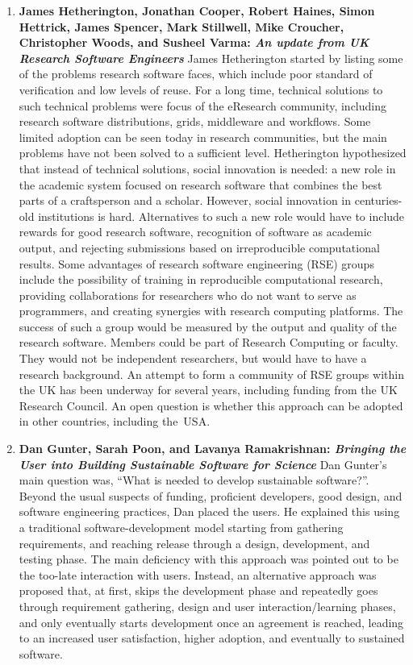 \documentclass[11pt, oneside]{amsart}
\begin{document}
\begin{enumerate}
\item \textbf{James Hetherington, Jonathan Cooper, Robert Haines, Simon
Hettrick, James Spencer, Mark Stillwell, Mike Croucher, Christopher Woods, and
Susheel Varma: \textit{An update from UK Research Software Engineers}} James
Hetherington started by listing some of the problems research software faces,
which include poor standard of verification and low levels of reuse. For a long
time, technical solutions to such technical problems were focus of the eResearch
community, including research software distributions, grids, middleware and
workflows. Some limited adoption can be seen today in research communities, but
the main problems have not been solved to a sufficient level. Hetherington
hypothesized that instead of technical solutions, social innovation is needed: a
new role in the academic system focused on research software that combines the
best parts of a craftsperson and a scholar. However, social innovation in
centuries-old institutions is hard. Alternatives to such a new role would have
to include rewards for good research software, recognition of software as
academic output, and rejecting submissions based on irreproducible computational
results. Some advantages of research software engineering (RSE) groups include
the possibility of training in reproducible computational research, providing
collaborations for researchers who do not want to serve as programmers, and
creating synergies with research computing platforms. The success of such a
group would be measured by the output and quality of the research software.
Members could be part of Research Computing or faculty. They would not be
independent researchers, but would have to have a research background. An
attempt to form a community of RSE groups within the UK has been underway for
several years, including funding from the UK Research Council. An open question
is whether this approach can be adopted in other countries, including the~USA.

\item \textbf{Dan Gunter, Sarah Poon, and Lavanya Ramakrishnan: \textit{Bringing
the User into Building Sustainable Software for Science}} Dan Gunter's main
question was, ``What is needed to develop sustainable software?''. Beyond the
usual suspects of funding, proficient developers, good design, and software
engineering practices, Dan placed the users. He explained this using a
traditional software-development model starting from gathering requirements, and
reaching release through a design, development, and testing phase. The main
deficiency with this approach was pointed out to be the too-late interaction
with users. Instead, an alternative approach was proposed that, at first, skips
the development phase and repeatedly goes through requirement gathering, design
and user interaction/learning phases, and only eventually starts development
once an agreement is reached, leading to an increased user satisfaction, higher
adoption, and eventually to sustained software.


\end{enumerate}
\end{document}
